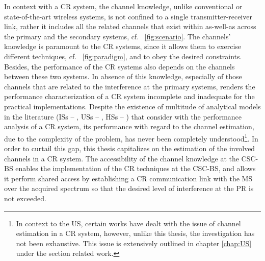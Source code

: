 In context with a CR system, the channel knowledge, unlike conventional or state-of-the-art wireless systems, is not confined to a single transmitter-receiver link, rather it includes all the related channels that exist within as-well-as across the primary and the secondary systems, cf. \figurename~\ref{fig:scenario}. The channels' knowledge is paramount to the CR systems, since it allows them to exercise different techniques, cf. \figurename~\ref{fig:paradigm}, and to obey the desired constraints. Besides, the performance of the CR systems also depends on the channels between these two systems. In absence of this knowledge, especially of those channels that are related to the interference at the primary systems, renders the performance characterization of a CR system incomplete and inadequate for the practical implementations. Despite the existence of multitude of analytical models in the literature (ISs -- \cite{Liang08, Sharma14, Pradhan15}, USs -- \cite{Xing07, Ghasemi07, Kang09}, HSs -- \cite{Song13, Gmira15, Jiang13, Fili15}) that consider with the performance analysis of a CR system, its performance with regard to the channel estimation, due to the complexity of the problem, has never been completely understood\footnote{In context to the US, certain works \cite{Musa09, Suraweera10, Kim12} have dealt with the issue of channel estimation in a CR system, however, unlike this thesis, the investigation has not been exhaustive. This issue is extensively outlined in chapter \ref{chap:US} under the section related work.}. In order to curtail this gap, this thesis capitalizes on the estimation of the involved channels in a CR system. The accessibility of the channel knowledge at the CSC-BS enables the implementation of the CR techniques at the CSC-BS, and allows it perform shared access by establishing a CR communication link with the MS over the acquired spectrum so that the desired level of interference at the PR is not exceeded. 

